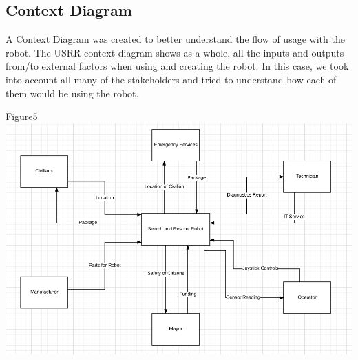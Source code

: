 \documentclass{article}
\begin{document}
\subsection{Context Diagram}
A Context Diagram was created to better understand the flow of usage with the robot. The USRR context diagram shows as a whole, all the inputs and outputs from/to external factors when using and creating the robot. In this case, we took into account all many of the stakeholders and tried to understand how each of them would be using the robot.
 \begin{center}{Figure5 \includegraphics[width=\textwidth]{ContextDiagram.png}}\end{center}
\end{document}
